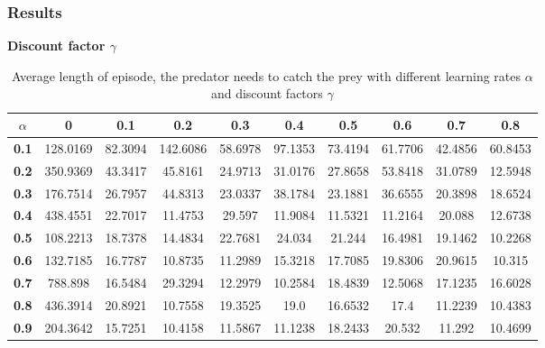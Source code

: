 \documentclass[11pt]{article}
\begin{document}
\subsubsection{Results}

\begin{center}
\begin{table*}[ht]
{\small
\hfill{}
\begin{center}
\textbf{Discount factor $\gamma$}\\
\end{center}
\begin{tabular}{c|c|c|c|c|c|c|c|c|c}
\textbf{$\alpha$} & \textbf{0} & \textbf{0.1} & \textbf{0.2} & \textbf{0.3} & \textbf{0.4} & \textbf{0.5} & \textbf{0.6} & \textbf{0.7} & \textbf{0.8}\\
	\hline
\textbf{0.1} & 128.0169 & 82.3094 & 142.6086 & 58.6978 & 97.1353 & 73.4194 & 61.7706 & 42.4856 & 60.8453\\
\textbf{0.2} & 350.9369 & 43.3417 & 45.8161 & 24.9713 & 31.0176 & 27.8658 & 53.8418 & 31.0789 & 12.5948\\
\textbf{0.3} & 176.7514 & 26.7957 & 44.8313 & 23.0337 & 38.1784 & 23.1881 & 36.6555 & 20.3898 & 18.6524\\
\textbf{0.4} & 438.4551 & 22.7017 & 11.4753 & 29.597 & 11.9084 & 11.5321 & 11.2164 & 20.088 & 12.6738\\
\textbf{0.5} & 108.2213 & 18.7378 & 14.4834 & 22.7681 & 24.034 & 21.244 & 16.4981 & 19.1462 & 10.2268\\
\textbf{0.6} & 132.7185 & 16.7787 & 10.8735 & 11.2989 & 15.3218 & 17.7085 & 19.8306 & 20.9615 & 10.315\\
\textbf{0.7} & 788.898 & 16.5484 & 29.3294 & 12.2979 & 10.2584 & 18.4839 & 12.5068 & 17.1235 & 16.6028\\
\textbf{0.8} & 436.3914 & 20.8921 & 10.7558 & 19.3525 & 19.0 & 16.6532 & 17.4 & 11.2239 & 10.4383\\
\textbf{0.9} & 204.3642 & 15.7251 & 10.4158 & 11.5867 & 11.1238 & 18.2433 & 20.532 & 11.292 & 10.4699\\
\end{tabular}}
\hfill{}
\caption{Average length of episode, the predator needs to catch the prey with different learning rates $\alpha$ and discount factors $\gamma$}
\label{table:task1}
\end{table*}
\end{center}


\end{document}

